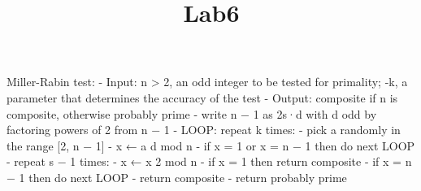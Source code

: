\documentclass[11pt]{article}
\title{Lab6}
\begin{document}
    
    \maketitle
    
    

    Miller-Rabin test: \newline
     - Input: n \textgreater{} 2, an odd integer to be tested for primality; \newline
     -k, a parameter that determines the accuracy of the test \newline
     - Output: composite if n is composite, otherwise probably prime \newline
- write n − 1 as 2s·d with d odd by factoring powers of 2 from n − 1 \newline
- LOOP: repeat k times: - pick a randomly in the range {[}2, n − 1{]} \newline
- x ← a d mod n \newline
- if x = 1 or x = n − 1 then do next LOOP \newline
- repeat s − 1 times:\newline
 - x ← x 2 mod n \newline
 - if x = 1 then return composite \newline
 - if x = n − 1 then do next LOOP \newline
- return composite \newline
- return probably prime
\end{document}
